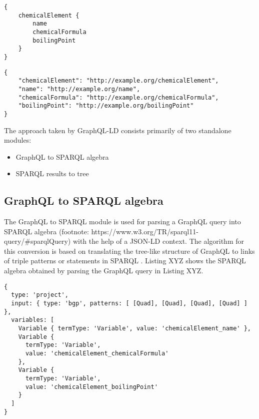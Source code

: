 \begin{minipage}{\linewidth}
\begin{lstlisting}[label=listing:listing6, caption={GraphQL query}]
{
	chemicalElement {
		name
		chemicalFormula
		boilingPoint
	}
}
\end{lstlisting}
\end{minipage}

\begin{minipage}{\linewidth}
\begin{lstlisting}[label=listing:listing7, caption={JSON-LD context}]
{
	"chemicalElement": "http://example.org/chemicalElement",
	"name": "http://example.org/name",
	"chemicalFormula": "http://example.org/chemicalFormula",
	"boilingPoint": "http://example.org/boilingPoint"
}
\end{lstlisting}
\end{minipage}

The approach taken by GraphQL-LD consists primarily of two standalone modules:
\begin{itemize}
	\item GraphQL to SPARQL algebra
	\item SPARQL results to tree
\end{itemize}


\subsection{GraphQL to SPARQL algebra}

The GraphQL to SPARQL module is used for parsing a GraphQL query into SPARQL algebra (footnote: https://www.w3.org/TR/sparql11-query/\#sparqlQuery) with the help of a JSON-LD context. The algorithm for this conversion is based on translating the tree-like structure of GraphQL to links of triple patterns or statements  in SPARQL \cite{Taelman2018}. Listing XYZ shows the SPARQL algebra obtained by parsing the GraphQL query in Listing XYZ.

\begin{minipage}{\linewidth}
\begin{lstlisting}[label=listing:listing8, caption={Generated SPARQL Algebra}]
{
  type: 'project',
  input: { type: 'bgp', patterns: [ [Quad], [Quad], [Quad], [Quad] ] },
  variables: [
    Variable { termType: 'Variable', value: 'chemicalElement_name' },
    Variable {
      termType: 'Variable',
      value: 'chemicalElement_chemicalFormula'
    },
    Variable {
      termType: 'Variable',
      value: 'chemicalElement_boilingPoint'
    }
  ]
}

\end{lstlisting}
\end{minipage}

